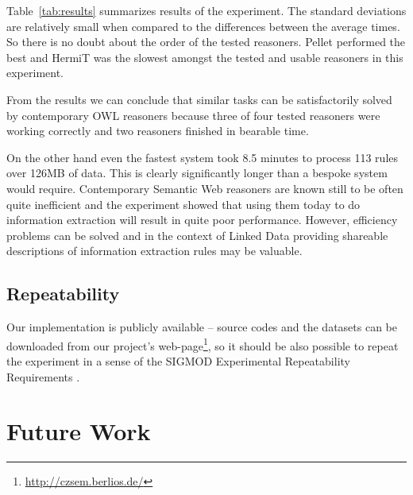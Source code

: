 Table~\ref{tab:results} summarizes results of the experiment. The standard deviations are relatively small when compared to the differences between the average times.  So there is no doubt about the order of the tested reasoners. Pellet performed the best and HermiT was the slowest amongst the tested and usable reasoners in this experiment.

From the results we can conclude that similar tasks can be satisfactorily solved by contemporary OWL reasoners because three of four tested reasoners were working correctly and two reasoners finished in bearable time.

On the other hand even the fastest system took 8.5 minutes to process 113 rules over 126MB of data. This is clearly   significantly longer than a bespoke system would require. 
Contemporary Semantic Web reasoners are known still to be often quite inefficient and the experiment showed that using them today to do information extraction will result in quite poor performance. However, efficiency problems can be solved
and in the context of Linked Data providing shareable descriptions of information extraction rules may be valuable.





\subsection{Repeatability}

Our implementation is publicly available -- source codes and the datasets can be downloaded from our project's web-page\footnote{\url{http://czsem.berlios.de/}}, so it should be also possible to repeat the experiment in a sense of  the SIGMOD Experimental Repeatability Requirements \citep{biblio:SIGMODrepeatability}.

\section{Future Work}


